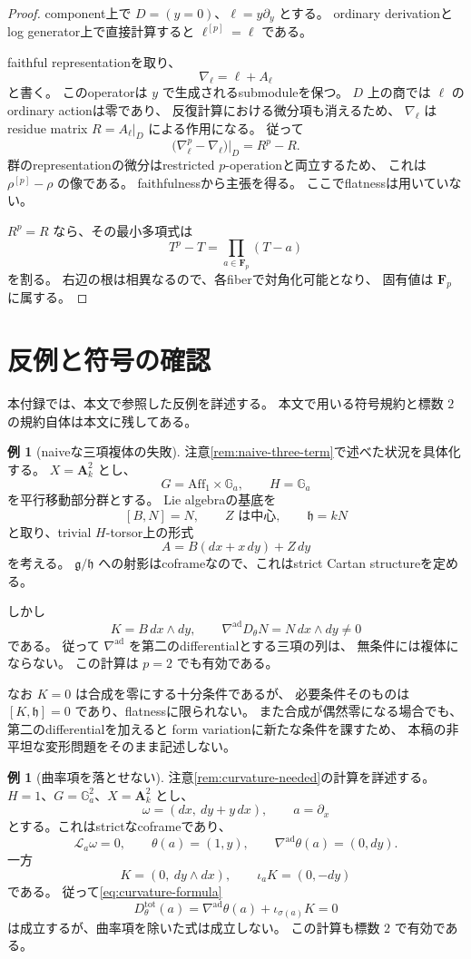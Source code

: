 \documentclass[uplatex,dvipdfmx,11pt]{jsarticle}
\numberwithin{equation}{section}
\theoremstyle{plain}
\theoremstyle{definition}
\newtheorem{example}[theorem]{例}
\theoremstyle{remark}
\newcommand{\GG}{\mathbb G}
\newcommand{\FF}{\mathbf F}
\newcommand{\g}{\mathfrak g}
\newcommand{\h}{\mathfrak h}
\newcommand{\Dtot}{D_\theta^{\mathrm{tot}}}
\newcommand{\nablaad}{\nabla^{\mathrm{ad}}}
\begin{document}
\begin{proof}
component上で \(D=(y=0)\)、\(\ell=y\partial_y\) とする。
ordinary derivationとlog generator上で直接計算すると
\(\ell^{[p]}=\ell\) である。

faithful representationを取り、
\[
\nabla_\ell=\ell+A_\ell
\]
と書く。
このoperatorは \(y\) で生成されるsubmoduleを保つ。
\(D\) 上の商では \(\ell\) のordinary actionは零であり、
反復計算における微分項も消えるため、
\(\nabla_\ell\) はresidue matrix \(R=A_\ell|_D\) による作用になる。
従って
\[
\bigl(\nabla_\ell^p-\nabla_\ell\bigr)|_D=R^p-R.
\]
群のrepresentationの微分はrestricted \(p\)-operationと両立するため、
これは \(\rho^{[p]}-\rho\) の像である。
faithfulnessから主張を得る。
ここでflatnessは用いていない。

\(R^p=R\) なら、その最小多項式は
\[
T^p-T=\prod_{a\in\FF_p}(T-a)
\]
を割る。
右辺の根は相異なるので、各fiberで対角化可能となり、
固有値は \(\FF_p\) に属する。
\end{proof}

\section{反例と符号の確認}
\label{app:counterexamples}

本付録では、本文で参照した反例を詳述する。
本文で用いる符号規約と標数 \(2\) の規約自体は本文に残してある。

\begin{example}[naiveな三項複体の失敗]
\label{ex:naive-three-term}
注意\ref{rem:naive-three-term}で述べた状況を具体化する。
\(X=\mathbf A_k^2\) とし、
\[
G=\mathrm{Aff}_1\times\GG_a,\qquad H=\GG_a
\]
を平行移動部分群とする。
Lie algebraの基底を
\[
[B,N]=N,\qquad Z\text{ は中心},\qquad\h=kN
\]
と取り、trivial \(H\)-torsor上の形式
\[
A=B(dx+x\,dy)+Z\,dy
\]
を考える。
\(\g/\h\) への射影はcoframeなので、これはstrict Cartan structureを定める。

しかし
\[
K=B\,dx\wedge dy,\qquad
\nablaad D_\theta N=N\,dx\wedge dy\ne0
\]
である。
従って \(\nablaad\) を第二のdifferentialとする三項の列は、
無条件には複体にならない。
この計算は \(p=2\) でも有効である。

なお \(K=0\) は合成を零にする十分条件であるが、
必要条件そのものは \([K,\h]=0\) であり、flatnessに限られない。
また合成が偶然零になる場合でも、第二のdifferentialを加えると
form variationに新たな条件を課すため、
本稿の非平坦な変形問題をそのまま記述しない。
\end{example}

\begin{example}[曲率項を落とせない]
\label{ex:curvature-term}
注意\ref{rem:curvature-needed}の計算を詳述する。
\(H=1\)、\(G=\GG_a^2\)、\(X=\mathbf A_k^2\) とし、
\[
\omega=(dx,\ dy+y\,dx),\qquad a=\partial_x
\]
とする。これはstrictなcoframeであり、
\[
\mathcal L_a\omega=0,\qquad
\theta(a)=(1,y),\qquad
\nablaad\theta(a)=(0,dy).
\]
一方
\[
K=(0,\ dy\wedge dx),\qquad
\iota_aK=(0,-dy)
\]
である。
従って\eqref{eq:curvature-formula}
\[
\Dtot(a)=\nablaad\theta(a)+\iota_{\sigma(a)}K=0
\]
は成立するが、曲率項を除いた式は成立しない。
この計算も標数 \(2\) で有効である。
\end{example}
\end{document}
